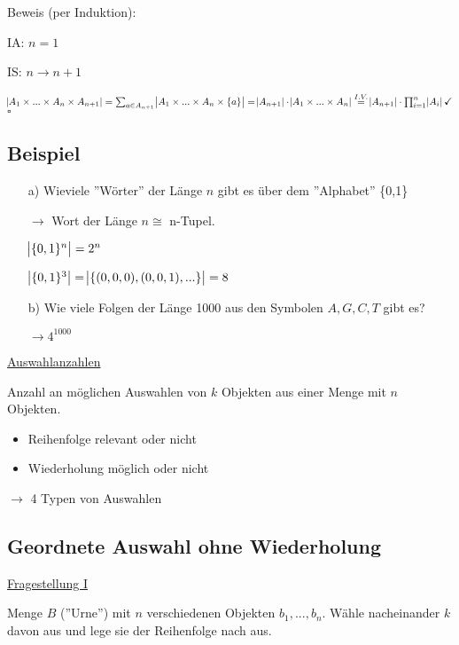 \documentclass[a4paper, 12pt, twoside] {article}
\begin{document}
Beweis (per Induktion):

IA: $n=1$ \checkmark

IS: $n \to n+1$

$\abs{A_1 \times ... \times A_n \times A_{n+1}} = \sum_{a \in A_{n+1}} \abs{A_1 \times ... \times A_n \times \{a\}} = \abs{A_{n+1}} \cdot \abs{A_1 \times ... \times A_n} \overset{I.V.}{=} \abs{A_{n+1}} \cdot \prod_{i=1}^n \abs{A_i} \checkmark$ \hfill $\square$

\subsection{Beispiel} %

\begin{itemize}
\item[a)] Wieviele ''Wörter'' der Länge $n$ gibt es über dem ''Alphabet'' \{0,1\}

$\to$ Wort der Länge $n \cong $ n-Tupel.

$\abs{\{0,1\}^n} = 2^n$

$\abs{\{0,1\}^3} = \abs{\{(0,0,0),(0,0,1),...\}} = 8$

\item[b)] Wie viele Folgen der Länge 1000 aus den Symbolen $A,G,C,T$ gibt es?

$\to 4^1000$

\end{itemize}

\uline{Auswahlanzahlen}

Anzahl an möglichen Auswahlen von $k$ Objekten aus einer Menge mit $n$ Objekten.



\begin{itemize}
\item Reihenfolge relevant oder nicht
\item Wiederholung möglich oder nicht
\end{itemize}
$\to$ 4 Typen von Auswahlen

\subsection{Geordnete Auswahl ohne Wiederholung} %

\underline{Fragestellung I}

Menge $B$ (''Urne'') mit $n$ verschiedenen Objekten $b_1,...,b_n$. Wähle nacheinander $k$ davon aus und lege sie der Reihenfolge nach aus.
\end{document}
